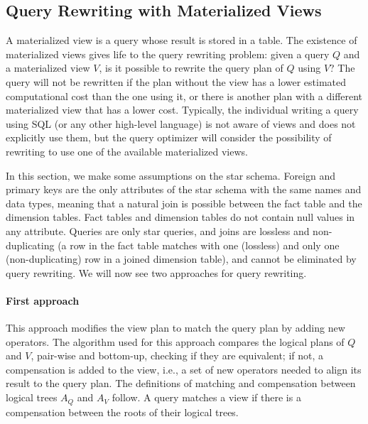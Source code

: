 \subsection{Query Rewriting with Materialized Views}

A materialized view is a query whose result is stored in a table. The existence of materialized views gives life to the query rewriting problem: given a query $Q$ and a materialized view $V$, is it possible to rewrite the query plan of $Q$ using $V$? The query will not be rewritten if the plan without the view has a lower estimated computational cost than the one using it, or there is another plan with a different materialized view that has a lower cost. Typically, the individual writing a query using SQL (or any other high-level language) is not aware of views and does not explicitly use them, but the query optimizer will consider the possibility of rewriting to use one of the available materialized views.

In this section, we make some assumptions on the star schema. Foreign and primary keys are the only attributes of the star schema with the same names and data types, meaning that a natural join is possible between the fact table and the dimension tables. Fact tables and dimension tables do not contain null values in any attribute. Queries are only star queries, and joins are lossless and non-duplicating (a row in the fact table matches with one (lossless) and only one (non-duplicating) row in a joined dimension table), and cannot be eliminated by query rewriting. We will now see two approaches for query rewriting.

\paragraph{First approach} This approach modifies the view plan to match the query plan by adding new operators. The algorithm used for this approach compares the logical plans of $Q$ and $V$, pair-wise and bottom-up, checking if they are equivalent; if not, a compensation is added to the view, i.e., a set of new operators needed to align its result to the query plan. The definitions of matching and compensation between logical trees $A_Q$ and $A_V$ follow. 
A query matches a view if there is a compensation between the roots of their logical trees.

